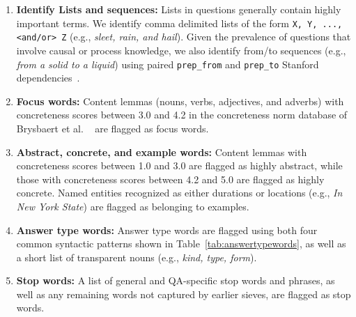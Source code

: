 \begin{enumerate}

\item {\bf Identify Lists and sequences:} Lists in questions generally contain highly important terms.  We identify comma delimited lists of the form {\small {\tt X, Y, ..., <and/or> Z}} (e.g., {\em sleet, rain, and hail}). Given the prevalence of questions that involve causal or process knowledge, we also identify from/to sequences (e.g., {\em from a solid to a liquid}) using paired {\tt prep\_from} and {\tt prep\_to} Stanford dependencies~\cite{de2008stanford}. 

\item {\bf Focus words:} Content lemmas (nouns, verbs, adjectives, and adverbs) with concreteness scores between 3.0 and 4.2 in the concreteness norm database of Brysbaert et al. ~\citeyear{brysbaert:2014} are flagged as focus words. 

\item {\bf Abstract, concrete, and example words:} Content lemmas with concreteness scores between 1.0 and 3.0 are flagged as highly abstract, while those with concreteness scores between 4.2 and 5.0 are flagged as highly concrete.  Named entities recognized as either durations or locations (e.g., {\em In New York State}) are flagged as belonging to examples.  

\item {\bf Answer type words:} Answer type words are flagged using both four common syntactic patterns shown in Table~\ref{tab:answertypewords}, as well as a short list of transparent nouns (e.g., {\em kind, type, form}). 

\item {\bf Stop words: } A list of general and QA-specific stop words and phrases, as well as any remaining words not captured by earlier sieves, are flagged as stop words.

\end{enumerate}

